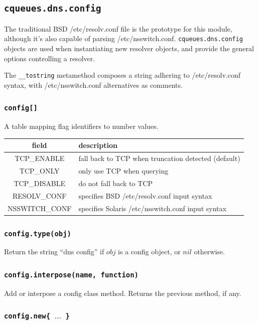 \documentclass[11pt, oneside]{memoir}
\newcommand*{\routine}[1]{\texttt{#1}\xspace}
\newcommand*{\fn}[1]{\texttt{#1}\xspace}
\newcommand*{\module}[1]{\texttt{#1}\xspace}
\newcounter{toccols}
\newenvironment{Module}[1]{
	\subsection{\texttt{#1}}
	\addtocontents{toc}{
		\protect\begin{multicols}{\value{toccols}}
	}
}{
	\addtocontents{toc}{\protect\end{multicols}}
}
\begin{document}
\begin{Module}{cqueues.dns.config}

The traditional BSD /etc/resolv.conf file is the prototype for this module, although it's also capable of parsing /etc/nsswitch.conf. \module{cqueues.dns.config} objects are used when instantiating new resolver objects, and provide the general options controlling a resolver.

The \fn{\_\_tostring} metamethod composes a string adhering to /etc/resolv.conf syntax, with /etc/nsswitch.conf alternatives as comments.

\subsubsection[\fn{config[]}]{\fn{config[]}}

A table mapping flag identifiers to number values.

\begin{tabular}{ c | l }
field & description\\\hline
TCP\_ENABLE & fall back to TCP when truncation detected (default)\\
TCP\_ONLY & only use TCP when querying\\
TCP\_DISABLE & do not fall back to TCP\\
RESOLV\_CONF & specifies BSD /etc/resolv.conf input syntax\\
NSSWITCH\_CONF & specifies Solaris /etc/nsswitch.conf input syntax
\end{tabular}

\subsubsection[\routine{config.type}]{\routine{config.type(obj)}}
Return the string ``dns config'' if $obj$ is a config object, or $nil$ otherwise.

\subsubsection[\fn{config.interpose}]{\fn{config.interpose(name, function)}}

Add or interpose a config class method. Returns the previous method, if any.

\subsubsection[\fn{config.new}]{\fn{config.new\{ $\ldots$ \}}}


\end{Module}
\end{document}
